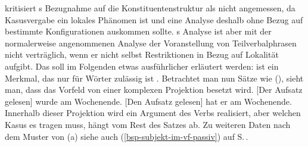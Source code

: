 \prz kritisiert \citeauthor{HM94a}s Bezugnahme auf die Konstituentenstruktur
als nicht angemessen, da Kasusvergabe ein lokales Phänomen ist und eine
Analyse deshalb ohne Bezug auf bestimmte Konfigurationen auskommen sollte. \prz{}s Analyse ist aber
mit der normalerweise angenommenen Analyse der Voranstellung von Teilverbalphrasen nicht verträglich, wenn er nicht
selbst Restriktionen in Bezug auf Lokalität aufgibt. Das soll im Folgenden
etwas ausführlicher erläutert werden: \argst ist ein Merkmal, das nur für
Wörter zulässig ist \citep[]{Prze99}. Betrachtet man nun Sätze wie
(), sieht man, dass das Vorfeld von einer komplexen Projektion
besetzt wird.
\eal
\label{bsp-der-den-aufsatz-gelesen}%
\label{bsp-der-aufsatz-gelesen}%
\ex {}[Der Aufsatz gelesen] wurde am Wochenende.
\ex {}[Den Aufsatz gelesen] hat er am Wochenende.
\zl
Innerhalb dieser Projektion wird ein Argument des Verbs realisiert,
aber welchen Kasus es tragen muss, hängt vom Rest des Satzes ab.
Zu weiteren Daten nach dem Muster von (a)
siehe auch (\ref{bsp-subjekt-im-vf-passiv}) auf S.\,\pageref{bsp-subjekt-im-vf-passiv}.



